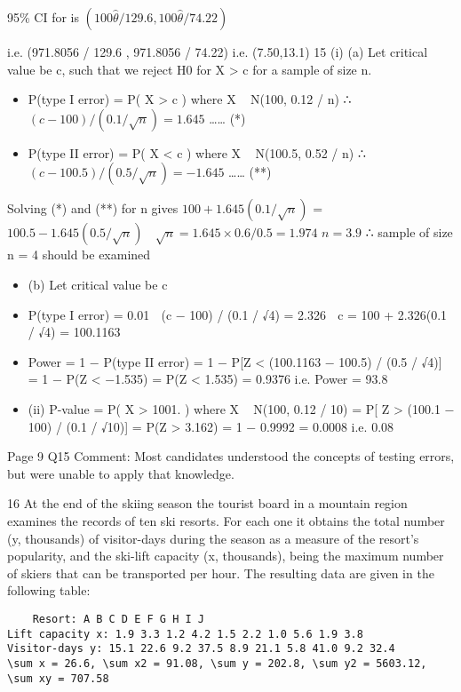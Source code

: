 \documentclass[a4paper,12pt]{article}
\begin{document}
95\% CI for \theta is $(100\hat{\theta} / 129.6 , 100\hat{\theta} / 74.22)$

i.e. (971.8056 / 129.6 , 971.8056 / 74.22) i.e. (7.50,13.1)
15 (i) (a) Let critical value be c, such that we reject H0 for X > c for a
sample of size n.
\begin{itemize}
    \item P(type I error) = P( X > c ) where X ~ N(100, 0.12 / n)
∴ $(c − 100) / (0.1 / \sqrt{n}) = 1.645$ …… (*)
    \item P(type II error) = P( X < c ) where X ~ N(100.5, 0.52 / n)
∴ $(c − 100.5) / (0.5 / \sqrt{n}) = −1.645$ …… (**)
\end{itemize}

Solving (*) and (**) for n gives $100 + 1.645(0.1/\sqrt{n})$ = $100.5 − 1.645(0.5 / \sqrt{n})$
 $\sqrt{n} = 1.645 × 0.6/0.5 = 1.974$ $n = 3.9$
∴ sample of size n = 4 should be examined
\begin{itemize}
    \item (b) Let critical value be c
\item P(type I error) = 0.01  (c − 100) / (0.1 / √4) = 2.326
∴ c = 100 + 2.326(0.1 / √4) = 100.1163
\item Power = 1 − P(type II error) = 1 − P[Z < (100.1163 − 100.5) / (0.5 / √4)]
= 1 − P(Z < −1.535) = P(Z < 1.535) = 0.9376 i.e. Power = 93.8%
\item (ii) P-value = P( X > 1001. ) where X ~ N(100, 0.12 / 10)
= P[ Z > (100.1 − 100) / (0.1 / √10)] = P(Z > 3.162) = 1 − 0.9992
= 0.0008 i.e. 0.08%
\end{itemize}

Page 9
Q15 Comment: Most candidates understood the concepts of testing errors, but
were unable to apply that knowledge.

16 At the end of the skiing season the tourist board in a mountain region examines
the records of ten ski resorts. For each one it obtains the total number (y,
thousands) of visitor-days during the season as a measure of the resort’s
popularity, and the ski-lift capacity (x, thousands), being the maximum number
of skiers that can be transported per hour. The resulting data are given in the
following table:
\begin{verbatim}
    Resort: A B C D E F G H I J
Lift capacity x: 1.9 3.3 1.2 4.2 1.5 2.2 1.0 5.6 1.9 3.8
Visitor-days y: 15.1 22.6 9.2 37.5 8.9 21.1 5.8 41.0 9.2 32.4
\sum x = 26.6, \sum x2 = 91.08, \sum y = 202.8, \sum y2 = 5603.12, \sum xy = 707.58
\end{verbatim}
\end{document}
